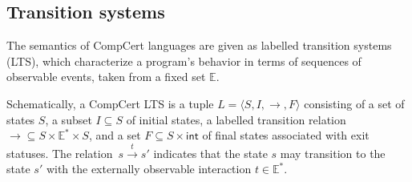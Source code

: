 \documentclass[sigplan,10pt,review,anonymous]{acmart}
\newcommand{\kw}[1]{\ensuremath{\mathsf{#1}}}
\newcommand{\refby}{\sqsubseteq}
\begin{document}
%

\subsection{Transition systems} %

The semantics of CompCert languages are
given as labelled transition systems (LTS),
which characterize a program's behavior in terms of
sequences of observable events,
taken from a fixed set $\mathbb{E}$.

Schematically, a CompCert LTS
is a tuple
$L = \langle S, I, {\rightarrow}, F \rangle$
consisting of
a set of states $S$,
a subset $I \subseteq S$ of initial states,
a labelled transition relation
${\rightarrow} \subseteq S \times \mathbb{E}^* \times S$,
and a set
$F \subseteq S \times \kw{int}$
of final states associated with exit statuses.
The relation~$s \stackrel{t}{\rightarrow} s'$
indicates that the state $s$ may transition to the state $s'$
with the externally observable interaction $t \in \mathbb{E}^*$.
\end{document}
